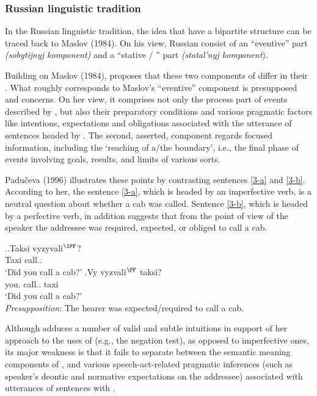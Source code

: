 \subsubsection{Russian linguistic tradition}
In the Russian linguistic tradition, the idea that  have a bipartite structure can be traced back to Maslov (1984). On his view, Russian  consist of an ``eventive'' part \textit{(sobytijnyj komponent)} and a ``stative / '' part \textit{(statal'nyj komponent}).

Building on Maslov (1984), \citet{Paducheva:96, Paducheva:11} proposes that these two components of  differ in their . What roughly corresponds to Maslov's ``eventive'' component is presupposed and concerns\linebreak {}. On her view, it comprises not only the process part of events described by , but also their preparatory conditions and various pragmatic factors like intentions, expectations and obligations associated with the utterance of sentences headed by . The second, asserted, component regards focused information, including the `reaching of a/the boundary', i.e., the final phase of events involving goals, results, and limits of various sorts. 

Padu\v{c}eva (1996) illustrates these points by contrasting sentences \ref{3-a} and \ref{3-b}. According to her, the sentence \ref{3-a}, which is headed by an imperfective verb, is a neutral question about whether a cab was called. Sentence \ref{3-b}, which is headed by a perfective verb, in addition suggests that from the point of view of the speaker the addressee was required, expected, or obliged to call a cab. 

\ex.\label{3}\ag.\label{3-a}Taksi vyzyvali$^{\IPF}$?\\
Taxi call..\\
\trans `Did you call a cab?'
\bg.\label{3-b}Vy vyzvali$^{\PF}$ taksi?\\
you. call.. taxi\\
\trans `Did you call a cab?'\\
\textit{Presupposition}: The hearer was expected/required to call a cab.\\

Although \citet{Paducheva:96} adduces a number of valid and subtle intuitions in support of her approach to the uses of  (e.g., the negation test), as opposed to imperfective ones, its major weakness is that it fails to separate between the semantic meaning components of ,  and various speech-act-related pragmatic inferences (such as speaker's deontic and normative expectations on the addressee) associated with utterances of sentences with . 
 
